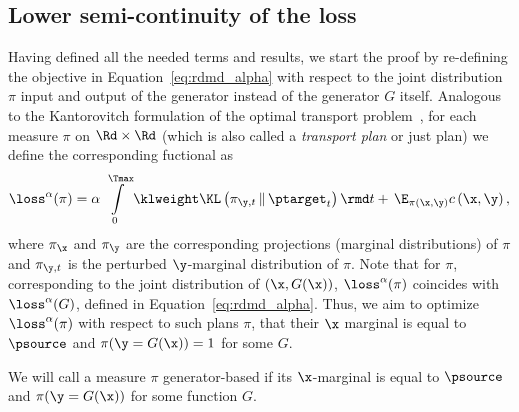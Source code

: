 \subsection{Lower semi-continuity of the loss}
\label{subsec:loss_lsc}
Having defined all the needed terms and results, we start the proof by re-defining the objective in Equation~\ref{eq:rdmd_alpha} with respect to the joint distribution $\pi$ input and output of the generator instead of the generator $G$ itself. Analogous to the Kantorovitch formulation of the optimal transport problem~\cite{kantorovitch1958translocation}, for each measure $\pi$ on $\Rd \times \Rd$ (which is also called a \emph{transport plan} or just plan) we define the corresponding fuctional as
\begin{equation}
    \loss^\alpha(\pi) = \alpha\, \int\limits_{0}^{\Tmax} \klweight \KL\left(\pi_{\y, t} \,\|\, \ptarget_t\right) \rmd t + \,\E_{\pi(\x, \y)} c\left(\x, \y\right),
\end{equation}
where $\pi_{\x}$ and $\pi_{\y}$ are the corresponding projections (marginal distributions) of $\pi$ and $\pi_{\y, t}$ is the perturbed $\y$-marginal distribution of $\pi$.  Note that for $\pi$, corresponding to the joint distribution of $(\x, G(\x))$, $\loss^\alpha(\pi)$ coincides with $\loss^\alpha(G)$, defined in Equation~\ref{eq:rdmd_alpha}. Thus, we aim to optimize $\loss^\alpha(\pi)$ with respect to such plans $\pi$, that their $\x$ marginal is equal to $\psource$ and $\pi(\y = G(\x)) = 1$ for some $G$.
\begin{definition}
\label{def:generator_based}
    We will call a measure $\pi$ generator-based if its $\x$-marginal is equal to $\psource$ and $\pi(\y = G(\x))$ for some function $G$.
\end{definition}

